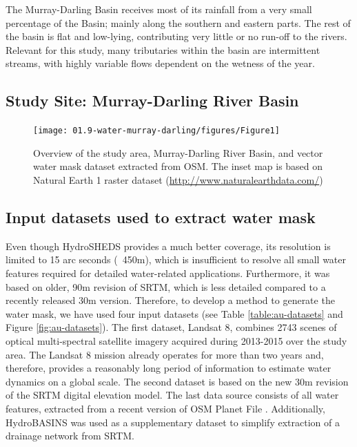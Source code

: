 The Murray-Darling Basin receives most of its rainfall from a very small percentage of the Basin; mainly along the southern and eastern parts. The rest of the basin is flat and low-lying, contributing very little or no run-off to the rivers. Relevant for this study, many tributaries within the basin are intermittent streams, with highly variable flows dependent on the wetness of the year.

\subsection{Study Site: Murray-Darling River Basin}
\begin{figure}[H]
	\centering
	\texttt{[image: 01.9-water-murray-darling/figures/Figure1]}
	\caption{Overview of the study area, Murray-Darling River Basin, and vector water mask dataset extracted from OSM. The inset map is based on Natural Earth 1 raster dataset (\url{http://www.naturalearthdata.com/})}
	\label{fig:au-study-area}
\end{figure}

\subsection{Input datasets used to extract water mask}
Even though HydroSHEDS provides a much better coverage, its resolution is limited to 15 arc seconds (~450m), which is insufficient to resolve all small water features required for detailed water-related applications. Furthermore, it was based on older, 90m revision of \gls{SRTM}, which is less detailed compared to a recently released 30m version. Therefore, to develop a method to generate the water mask, we have used four input datasets (see Table \ref{table:au-datasets} and Figure \ref{fig:au-datasets}). The first dataset, Landsat 8, combines 2743 scenes of optical multi-spectral satellite imagery acquired during 2013-2015 over the study area. The Landsat 8 mission already operates for more than two years and, therefore, provides a reasonably long period of information to estimate water dynamics on a global scale. The second dataset is based on the new 30m revision of the \gls{SRTM} digital elevation model. The last data source consists of all water features, extracted from a recent version of OSM Planet File \citet{dataOSMPlanet}. Additionally, HydroBASINS \citet{Lehner2013} was used as a supplementary dataset to simplify extraction of a drainage network from \gls{SRTM}.

